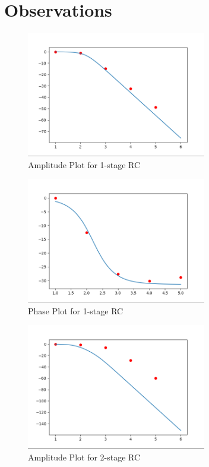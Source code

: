 \documentclass{article}
\begin{document}
\section{Observations}
\begin{figure}[H]
    \centering
    \includegraphics[width=0.7\textwidth]{figs/ampl_1cas.png}
    \caption{Amplitude Plot for 1-stage RC}
\end{figure}
\begin{figure}[H]
    \centering
    \includegraphics[width=0.7\textwidth]{figs/phase_1cas.png}
    \caption{Phase Plot for 1-stage RC}
\end{figure}
\begin{figure}[H]
    \centering
    \includegraphics[width=0.7\textwidth]{figs/ampl_2cas.png}
    \caption{Amplitude Plot for 2-stage RC}
\end{figure}
\end{document}
